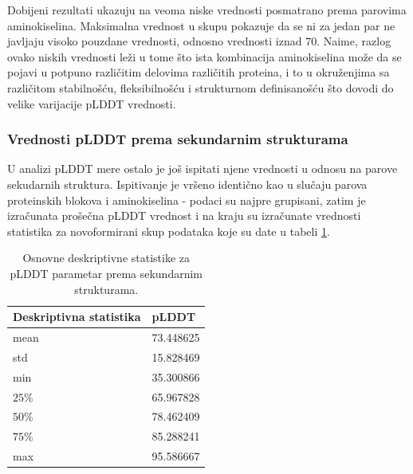 \documentclass[a4paper,12pt]{article}
\begin{document}
Dobijeni rezultati ukazuju na veoma niske vrednosti posmatrano prema parovima aminokiselina. Maksimalna vrednost u skupu pokazuje da se ni za jedan par ne javljaju visoko pouzdane vrednosti, odnosno vrednosti iznad 70. Naime, razlog ovako niskih vrednosti leži u tome što ista kombinacija aminokiselina može da se pojavi u potpuno različitim delovima različitih proteina, i to u okruženjima sa različitom stabilnošću, fleksibilnošću i strukturnom definisanošću što dovodi do velike varijacije pLDDT vrednosti.
\subsubsection{Vrednosti pLDDT prema sekundarnim strukturama}
U analizi pLDDT mere ostalo je još ispitati njene vrednosti u odnosu na parove sekudarnih struktura. Ispitivanje je vršeno identično kao u slučaju parova proteinskih blokova i aminokiselina - podaci su najpre grupisani, zatim je izračunata prošečna pLDDT vrednost i na kraju su izračunate vrednosti statistika za novoformirani skup podataka koje su date u tabeli \ref{Tabela:8}.
\begin{table}[h!]
    \centering
    \begin{tabular}{ |l|l| } 
    \hline
    \textbf{Deskriptivna statistika} & \textbf{pLDDT} \\
    \hline
    mean & 73.448625 \\
    std  & 15.828469 \\
    min  & 35.300866 \\
    $25\%$  & 65.967828 \\
    $50\%$  & 78.462409 	\\
    $75\%$ & 85.288241\\
    max & 95.586667 	\\
    \hline
    \end{tabular}
    \caption{Osnovne deskriptivne statistike za pLDDT parametar prema sekundarnim strukturama.}
    \label{Tabela:8}
\end{table}
\end{document}
